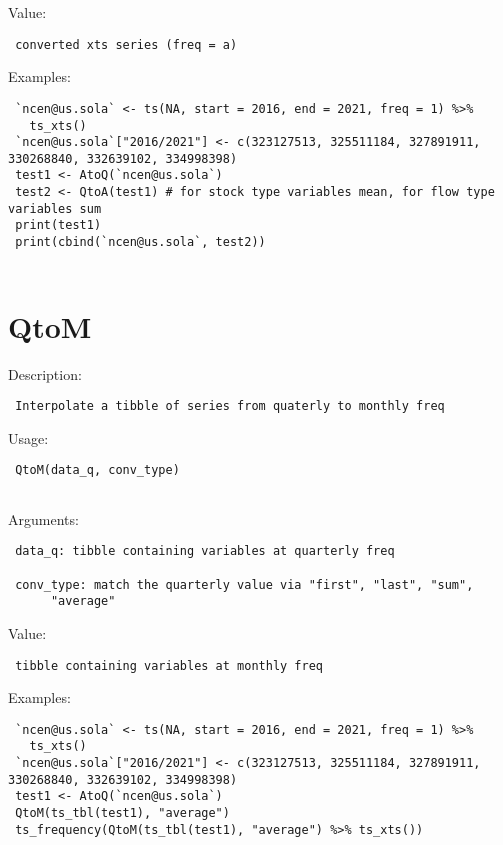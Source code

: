 \documentclass[
  letterpaper,
  DIV=11,
  numbers=noendperiod]{scrreport}
\begin{document}
Value:

\begin{verbatim}
 converted xts series (freq = a)
\end{verbatim}

Examples:

\begin{verbatim}
 `ncen@us.sola` <- ts(NA, start = 2016, end = 2021, freq = 1) %>% 
   ts_xts()
 `ncen@us.sola`["2016/2021"] <- c(323127513, 325511184, 327891911, 330268840, 332639102, 334998398)
 test1 <- AtoQ(`ncen@us.sola`)
 test2 <- QtoA(test1) # for stock type variables mean, for flow type variables sum
 print(test1)
 print(cbind(`ncen@us.sola`, test2))
 
\end{verbatim}

\hypertarget{qtom}{%
\section{QtoM}\label{qtom}}

Description:

\begin{verbatim}
 Interpolate a tibble of series from quaterly to monthly freq
\end{verbatim}

Usage:

\begin{verbatim}
 QtoM(data_q, conv_type)
 
\end{verbatim}

Arguments:

\begin{verbatim}
 data_q: tibble containing variables at quarterly freq

 conv_type: match the quarterly value via "first", "last", "sum",
      "average"
\end{verbatim}

Value:

\begin{verbatim}
 tibble containing variables at monthly freq
\end{verbatim}

Examples:

\begin{verbatim}
 `ncen@us.sola` <- ts(NA, start = 2016, end = 2021, freq = 1) %>% 
   ts_xts()
 `ncen@us.sola`["2016/2021"] <- c(323127513, 325511184, 327891911, 330268840, 332639102, 334998398)
 test1 <- AtoQ(`ncen@us.sola`)
 QtoM(ts_tbl(test1), "average")
 ts_frequency(QtoM(ts_tbl(test1), "average") %>% ts_xts())
 
\end{verbatim}
\end{document}
